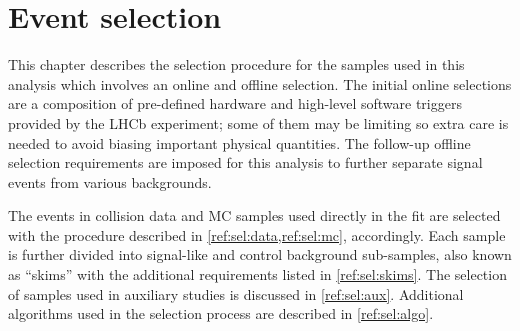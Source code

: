 \chapter{Event selection}
\label{ref:sel}

This chapter describes the selection procedure for the samples used in this
analysis which involves an online and offline selection.
The initial online selections are a composition of
pre-defined hardware and high-level software triggers provided by the LHCb
experiment;
some of them may be limiting so extra care is needed to avoid biasing important
physical quantities.
The follow-up offline selection requirements are imposed for this analysis
to further separate signal events from various backgrounds.

The events in collision data and MC samples used directly in the fit are
selected with the procedure
described in \cref{ref:sel:data,ref:sel:mc}, accordingly.
Each sample is further divided into signal-like and control background
sub-samples, also known as ``skims''
with the additional requirements listed in \cref{ref:sel:skims}.
The selection of samples used in auxiliary studies is discussed in
\cref{ref:sel:aux}.
Additional algorithms used in the selection process are described in
\cref{ref:sel:algo}.









%
%
